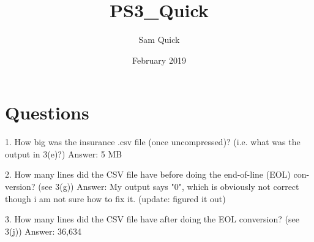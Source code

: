 \documentclass{article}
\title{PS3_Quick}
\author{Sam Quick}
\date{February 2019}
\begin{document}
\maketitle

\section{Questions}

1. How big was the insurance .csv file (once uncompressed)? (i.e. what was the output in 3(e)?) Answer: 5 MB

2. How many lines did the CSV file have before doing the end-of-line (EOL) con- version? (see 3(g)) Answer: My output says "0", which is obviously not correct though i am not sure how to fix it. (update: figured it out)

3. How many lines did the CSV file have after doing the EOL conversion? (see 3(j)) Answer: 36,634
\end{document}
